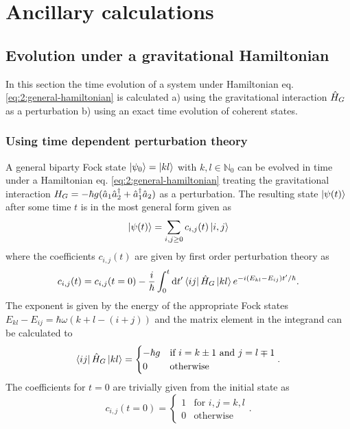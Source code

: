 \chapter{Ancillary calculations}\label{apx:ancillary-calculations}


\section{Evolution under a gravitational Hamiltonian}
In this section the time evolution of a system under Hamiltonian eq. \eqref{eq:2:general-hamiltonian} is calculated a) using the gravitational interaction $\hat{H}_G$ as a perturbation b) using an exact time evolution of coherent states.

\subsection{Using time dependent perturbation theory}
\label{apx:general-state-perturbation-theory}
A general biparty Fock state $\ket{\psi_0} = \ket{kl}$ with $k, l \in \mathbb{N}_0$ can be evolved in time under a Hamiltonian eq. \eqref{eq:2:general-hamiltonian} treating the gravitational interaction $H_G = -\hbar g (\hat{a}_1\hat{a}_2^\dagger + \hat{a}_1^\dagger\hat{a}_2)$ as a perturbation. 
The resulting state $\ket{\psi(t)}$ after some time $t$ is in the most general form given as
\begin{equation}
  \ket{\psi(t)} = \sum_{i, j \geq 0} c_{i,j}(t) \ket{i,j}
\end{equation}
where the coefficients $c_{i,j}(t)$ are given by first order perturbation theory as
\begin{equation}
  c_{i,j}(t) = c_{i,j}(t = 0) - \frac{i}{\hbar} \int_0^t \dd t' \bra{ij}\hat{H}_G\ket{kl} e^{-i(E_{kl}-E_{ij})t'/\hbar} .
\end{equation}
The exponent is given by the energy of the appropriate Fock states $E_{kl}-E_{ij} = \hbar \omega (k+l - (i+j))$ and the matrix element in the integrand can be calculated to
\begin{equation}
  \bra{ij}\hat{H}_G\ket{kl} =
  \begin{cases}
    -\hbar g & \text{if } i = k \pm 1 \text{ and } j = l \mp 1 \\
    0 & \text{otherwise}
  \end{cases}.
\end{equation}
The coefficients for $t=0$ are trivially given from the initial state as
\begin{equation}
  c_{i,j}(t=0) = \begin{cases}
    1 & \text{for } i,j = k,l \\
    0 & \text{otherwise}
  \end{cases}.
\end{equation}
